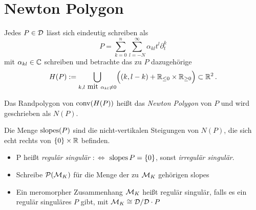\section{Newton Polygon} %
Jedes $P\in \mathcal{D}$ lässt sich eindeutig schreiben als
\[ P=\sum^{n}_{k=0}{\sum^{\infty}_{l=-N}{\alpha_{kl}t^l\partial_t^k}} \]
mit $\alpha_{kl}\in\mathbb{C}$ schreiben und betrachte das zu $P$ dazugehörige
\[ H(P):=\underset{k,l\mbox{ mit }\alpha_{kl}\neq0}{\bigcup}\Big( (k,l-k) +
\mathbb{R}_{\leq 0}\times \mathbb{R}_{\geq 0} \Big) \subset \mathbb{R}^2 \,. \]

\begin{defn} %
  Das Randpolygon von $\operatorname{conv}(H(P))$ heißt das \emph{Newton Polygon} von $P$ und
  wird geschrieben als $N(P)$.
\end{defn}

\begin{defn} %
  Die Menge $\operatorname{slopes}(P)$ sind die nicht-vertikalen Steigungen von $N(P)$, die
  sich echt rechts von $\{0\}\times\mathbb{R}$ befinden.\\ %
  \begin{itemize}
    \item P heißt \emph{regulär singulär} $:\Leftrightarrow$
      $\operatorname{slopes}{P}=\{0\}$, sonst \emph{irregulär singulär}.
    \item Schreibe $\mathcal{P}(\mathcal{M}_K)$ für die Menge der zu $\mathcal{M}_K$ gehörigen slopes
    \item Ein meromorpher Zusammenhang $\mathcal{M}_K$ heißt regulär singulär, falls es
      ein regulär singuläres $P$ gibt, mit $\mathcal{M}_K\cong\mathcal{D}/\mathcal{D}\cdot P$
  \end{itemize}
\end{defn}

